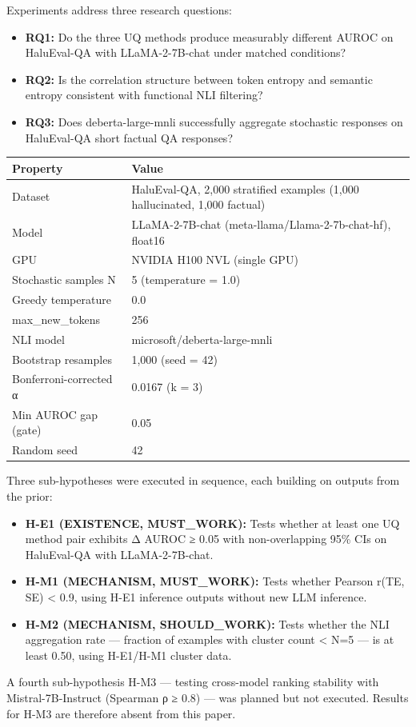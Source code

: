 
Experiments address three research questions:

\begin{itemize}
\item \textbf{RQ1:} Do the three UQ methods produce measurably different AUROC on HaluEval-QA with LLaMA-2-7B-chat under matched conditions?
\item \textbf{RQ2:} Is the correlation structure between token entropy and semantic entropy consistent with functional NLI filtering?
\item \textbf{RQ3:} Does deberta-large-mnli successfully aggregate stochastic responses on HaluEval-QA short factual QA responses?
\end{itemize}

\begin{table}[htbp]
\centering
\begin{tabular}{ll}
\toprule
Property & Value \\
\midrule
Dataset & HaluEval-QA, 2,000 stratified examples (1,000 hallucinated, 1,000 factual) \\
Model & LLaMA-2-7B-chat (meta-llama/Llama-2-7b-chat-hf), float16 \\
GPU & NVIDIA H100 NVL (single GPU) \\
Stochastic samples N & 5 (temperature = 1.0) \\
Greedy temperature & 0.0 \\
max_new_tokens & 256 \\
NLI model & microsoft/deberta-large-mnli \\
Bootstrap resamples & 1,000 (seed = 42) \\
Bonferroni-corrected α & 0.0167 (k = 3) \\
Min AUROC gap (gate) & 0.05 \\
Random seed & 42 \\
\bottomrule
\end{tabular}
\end{table}

Three sub-hypotheses were executed in sequence, each building on outputs from the prior:

\begin{itemize}
\item \textbf{H-E1 (EXISTENCE, MUST_WORK):} Tests whether at least one UQ method pair exhibits Δ AUROC ≥ 0.05 with non-overlapping 95\% CIs on HaluEval-QA with LLaMA-2-7B-chat.
\item \textbf{H-M1 (MECHANISM, MUST_WORK):} Tests whether Pearson r(TE, SE) < 0.9, using H-E1 inference outputs without new LLM inference.
\item \textbf{H-M2 (MECHANISM, SHOULD_WORK):} Tests whether the NLI aggregation rate — fraction of examples with cluster count < N=5 — is at least 0.50, using H-E1/H-M1 cluster data.
\end{itemize}

A fourth sub-hypothesis H-M3 — testing cross-model ranking stability with Mistral-7B-Instruct (Spearman ρ ≥ 0.8) — was planned but not executed. Results for H-M3 are therefore absent from this paper.

